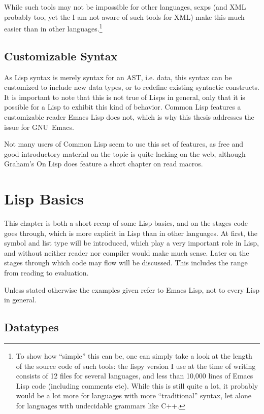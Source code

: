\documentclass[a4paper,10pt,twoside]{report}
\newcommand{\el}{Emacs Lisp}
\newcommand{\cl}{Common Lisp}
\newcommand{\emacs}{GNU~Emacs}
\begin{document}
While such tools may not be impossible for other languages, sexps (and XML
probably too, yet the I am not aware of such tools for XML) make this much
easier than in other languages.\footnote{To show how ``simple'' this can be, one
  can simply take a look at the length of the source code of such tools: the
  lispy version I use at the time of writing consists of 12 files for several
  languages, and less than 10,000 lines of \el{} code (including comments etc).
  While this is still quite a lot, it probably would be a lot more for languages
  with more ``traditional'' syntax, let alone for languages with undecidable
  grammars like C++.}

\pagebreak

\subsection{Customizable Syntax}
\label{subsec:custom-syntax}

As Lisp syntax is merely syntax for an AST, i.e. data, this syntax can be
customized to include new data types, or to redefine existing syntactic
constructs.  It is important to note that this is not true of Lisps in general,
only that it is possible for a Lisp to exhibit this kind of behavior.  \cl{}
features a customizable reader \el{} does not, which is why this thesis
addresses the issue for \emacs{}.

Not many users of \cl{} seem to use this set of features, as free and good
introductory material on the topic is quite lacking on the web, although
Graham’s On Lisp does feature a short chapter on read macros.\cite[Chapter
17---``Read Macros'']{on-lisp}

\section{Lisp Basics}
\label{section:lisp-basics}

This chapter is both a short recap of some Lisp basics, and on the stages code
goes through, which is more explicit in Lisp than in other languages.  At
first, the symbol and list type will be introduced, which play a very important
role in Lisp, and without neither reader nor compiler would make much sense.
Later on the stages through which code may flow will be discussed.  This
includes the range from reading to evaluation.

Unless stated otherwise the examples given refer to \el{}, not to every Lisp in
general.

\subsection{Datatypes}
\label{subsec:datatypes}
\end{document}
